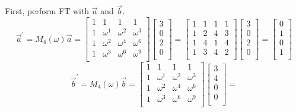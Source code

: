 \documentclass[11pt]{article}
\newenvironment{qparts}{\begin{enumerate}[{(}a{)}]}{\end{enumerate}}
\begin{document}
\begin{qparts}
	First, perform FT with $\vec a$ and $\vec b$.
	\[
		\vec a^\prime = M_4(\omega)\vec a
		= 
		\begin{bmatrix} 
			1 & 1 & 1 & 1 \\ 
			1 & \omega^1 & \omega^2 & \omega^3 \\ 
			1 & \omega^2 & \omega^4 & \omega^6 \\ 
			1 & \omega^3 & \omega^6 & \omega^9 \\ 
		\end{bmatrix}
		\begin{bmatrix} 
			3 \\ 
			0 \\ 
			2 \\ 
			0 \\ 
		\end{bmatrix}
		=
		\begin{bmatrix} 
			1 & 1 & 1 & 1 \\ 
			1 & 2 & 4 & 3 \\ 
			1 & 4 & 1 & 4 \\ 
			1 & 3 & 4 & 2 \\ 
		\end{bmatrix}		
		\begin{bmatrix} 
			3 \\ 
			0 \\ 
			2 \\ 
			0 \\ 
		\end{bmatrix}
		=
		\begin{bmatrix} 
			0 \\ 
			1 \\ 
			0 \\ 
			1 \\ 
		\end{bmatrix}
	\]
	\[
		\vec b^\prime = M_4(\omega)\vec b
		= 
		\begin{bmatrix} 
			1 & 1 & 1 & 1 \\ 
			1 & \omega^1 & \omega^2 & \omega^3 \\ 
			1 & \omega^2 & \omega^4 & \omega^6 \\ 
			1 & \omega^3 & \omega^6 & \omega^9 \\ 
		\end{bmatrix}
		\begin{bmatrix} 
			3 \\ 
			4 \\ 
			0 \\ 
			0 \\ 
		\end{bmatrix}
		=
\]
\end{qparts}
\end{document}
